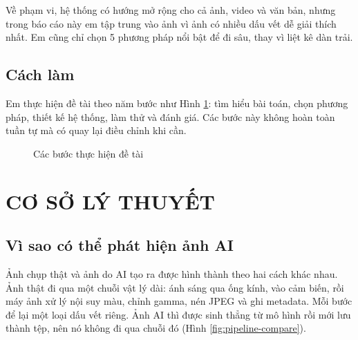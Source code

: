 \documentclass[14pt,a4paper,oneside]{report}
\begin{document}
Về phạm vi, hệ thống có hướng mở rộng cho cả ảnh, video và văn bản, nhưng trong báo cáo này em tập trung vào ảnh vì ảnh có nhiều dấu vết dễ giải thích nhất. Em cũng chỉ chọn 5 phương pháp nổi bật để đi sâu, thay vì liệt kê dàn trải.

\section{Cách làm}
Em thực hiện đề tài theo năm bước như Hình \ref{fig:research-process}: tìm hiểu bài toán, chọn phương pháp, thiết kế hệ thống, làm thử và đánh giá. Các bước này không hoàn toàn tuần tự mà có quay lại điều chỉnh khi cần.

\begin{figure}[h]
\centering
{}
\caption{Các bước thực hiện đề tài}
\label{fig:research-process}
\end{figure}

\clearpage

\chapter{CƠ SỞ LÝ THUYẾT}

\section{Vì sao có thể phát hiện ảnh AI}
Ảnh chụp thật và ảnh do AI tạo ra được hình thành theo hai cách khác nhau. Ảnh thật đi qua một chuỗi vật lý dài: ánh sáng qua ống kính, vào cảm biến, rồi máy ảnh xử lý nội suy màu, chỉnh gamma, nén JPEG và ghi metadata. Mỗi bước để lại một loại dấu vết riêng. Ảnh AI thì được sinh thẳng từ mô hình rồi mới lưu thành tệp, nên nó không đi qua chuỗi đó (Hình \ref{fig:pipeline-compare}).
\end{document}
